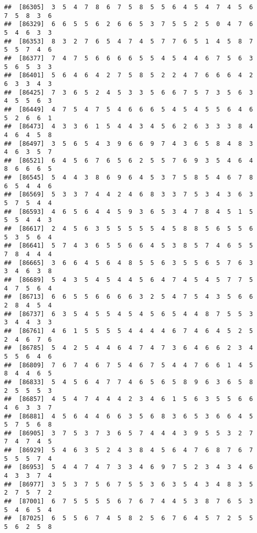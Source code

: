 \documentclass[
]{book}
\begin{document}
\begin{verbatim}
##  [86305]  3  5  4  7  8  6  7  5  8  5  5  6  4  5  4  7  4  5  6  7  5  8  3  6
##  [86329]  6  6  5  5  6  2  6  6  5  3  7  5  5  2  5  0  4  7  6  5  4  6  3  3
##  [86353]  8  3  2  7  6  5  4  7  4  5  7  7  6  5  1  4  5  8  7  5  5  7  4  6
##  [86377]  7  4  7  5  6  6  6  6  5  5  4  5  4  4  6  7  5  6  3  5  6  5  3  3
##  [86401]  5  6  4  6  4  2  7  5  8  5  2  2  4  7  6  6  6  4  2  6  3  3  4  3
##  [86425]  7  3  6  5  2  4  5  3  3  5  6  6  7  5  7  3  5  6  3  4  5  5  6  3
##  [86449]  4  7  5  4  7  5  4  6  6  6  5  4  5  4  5  5  6  4  6  5  2  6  6  1
##  [86473]  4  3  3  6  1  5  4  4  3  4  5  6  2  6  3  3  3  8  4  4  6  4  5  8
##  [86497]  3  5  6  5  4  3  9  6  6  9  7  4  3  6  5  8  4  8  3  4  6  3  5  7
##  [86521]  6  4  5  6  7  6  5  6  2  5  5  7  6  9  3  5  4  6  4  8  6  6  6  5
##  [86545]  5  4  4  3  8  6  9  6  4  5  3  7  5  8  5  4  6  7  8  6  5  4  4  6
##  [86569]  5  3  3  7  4  4  2  4  6  8  3  3  7  5  3  4  3  6  3  5  7  5  4  4
##  [86593]  4  6  5  6  4  4  5  9  3  6  5  3  4  7  8  4  5  1  5  5  5  4  4  3
##  [86617]  2  4  5  6  3  5  5  5  5  5  4  5  8  8  5  6  5  5  6  5  3  5  6  4
##  [86641]  5  7  4  3  6  5  5  6  6  4  5  3  8  5  7  4  6  5  5  7  8  4  4  4
##  [86665]  3  6  6  4  5  6  4  8  5  5  6  3  5  5  6  5  7  6  3  3  4  6  3  8
##  [86689]  5  4  3  5  4  5  4  4  5  6  4  7  4  5  4  5  7  7  5  4  7  5  6  4
##  [86713]  6  6  5  5  6  6  6  6  3  2  5  4  7  5  4  3  5  6  6  2  8  4  5  4
##  [86737]  6  3  5  4  5  5  4  5  4  5  6  5  4  4  8  7  5  5  3  3  4  4  3  3
##  [86761]  4  6  1  5  5  5  5  4  4  4  4  6  7  4  6  4  5  2  5  2  4  6  7  6
##  [86785]  5  4  2  5  4  4  6  4  7  4  7  3  6  4  6  6  2  3  4  5  5  6  4  6
##  [86809]  7  6  7  4  6  7  5  4  6  7  5  4  4  7  6  6  1  4  5  8  4  4  6  5
##  [86833]  5  4  5  6  4  7  7  4  6  5  6  5  8  9  6  3  6  5  8  2  5  5  5  3
##  [86857]  4  5  4  7  4  4  4  2  3  4  6  1  5  6  3  5  5  6  6  4  6  3  3  7
##  [86881]  4  5  6  4  4  6  6  3  5  6  8  3  6  5  3  6  6  4  5  5  7  5  6  8
##  [86905]  3  7  5  3  7  3  6  5  7  4  4  4  3  9  5  5  3  2  7  7  4  7  4  5
##  [86929]  5  4  6  3  5  2  4  3  8  4  5  6  4  7  6  8  7  6  7  5  5  5  7  4
##  [86953]  5  4  4  7  4  7  3  3  4  6  9  7  5  2  3  4  3  4  6  4  3  3  7  4
##  [86977]  3  5  3  7  5  6  7  5  5  3  6  3  5  4  3  4  8  3  5  2  7  5  7  2
##  [87001]  6  7  5  5  5  5  6  7  6  7  4  4  5  3  8  7  6  5  3  5  4  6  5  4
##  [87025]  6  5  5  6  7  4  5  8  2  5  6  7  6  4  5  7  2  5  5  5  6  2  5  8

\end{verbatim}
\end{document}
